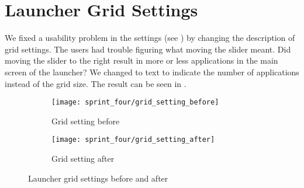 
\section{Launcher Grid Settings}
\label{sec:launcher_grid_setting}
We fixed a usability problem in the \launcher settings (see ) by changing the description of grid settings. The users had trouble figuring what moving the slider meant. Did moving the slider to the right result in more or less applications in the main screen of the launcher? We changed to text to indicate the number of applications instead of the grid size. The result can be seen in . 

\begin{figure}[!htbp]
    \centering

    \begin{subfigure}[t]{0.75\textwidth}
        \texttt{[image: sprint\_four/grid\_setting\_before]}
        \caption{Grid setting before}
        \label{fig:launcher_grid_settings_old}
        \vspace*{1cm}
    \end{subfigure}
    \begin{subfigure}[t]{0.75\textwidth}
        \texttt{[image: sprint\_four/grid\_setting\_after]}
        \caption{Grid setting after}
        \label{fig:launcher_grid_settings_new}
    \end{subfigure}
    
    \caption{Launcher grid settings before and after}
    \label{fig:launcher_grid_settings}
\end{figure}